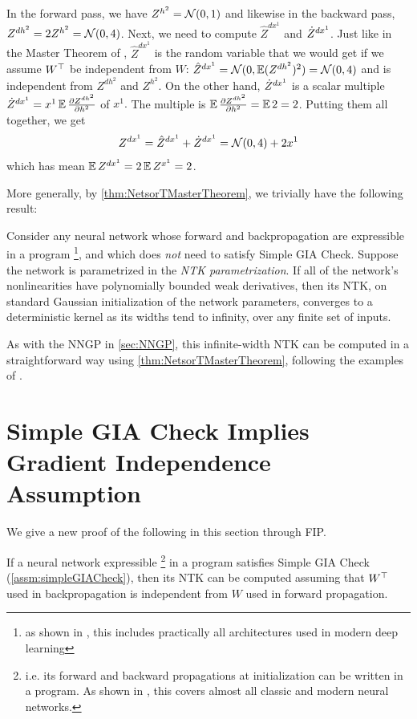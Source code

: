 \documentclass[main.tex]{subfiles}
\begin{document}
In the forward pass, we have $Z^{h^{2}}=\mathcal{N}(0,1)$ and likewise in the backward pass, $Z^{dh^{2}}=2Z^{h^{2}}=\mathcal{N}(0,4)$. Next, we need to compute $\hat{Z}^{dx^{1}}$ and $\dot Z^{dx^{1}}$. Just like in the Master Theorem of \citet{yangTP2}, $\hat{Z}^{dx^{1}}$ is the random variable that we would get if we assume $W^{\top}$ be independent from $W$: $\hat{Z}^{dx^{1}}=\mathcal{N}(0,\operatorname*{\mathbb{E}}(Z^{dh^{2}})^{2})=\mathcal{N}(0,4)$ and is independent from $Z^{dh^{2}}$ and $Z^{h^{2}}$. On the other hand, $\dot Z^{dx^{1}}$ is a scalar multiple $\dot Z^{dx^{1}}=x^{1}\operatorname*{\mathbb{E}}\frac{\partial Z^{dh^{2}}}{\partial h^{2}}$ of $x^{1}.$ The multiple is $\operatorname*{\mathbb{E}}\frac{\partial Z^{dh^{2}}}{\partial h^{2}}=\operatorname*{\mathbb{E}}2=2$. Putting them all together, we get
\[
Z^{dx^{1}}=\hat{Z}^{dx^{1}}+\dot Z^{dx^{1}}=\mathcal{N}(0,4)+2x^{1}
\]
which has mean $\operatorname*{\mathbb{E}} Z^{dx^{1}}=2\operatorname*{\mathbb{E}} Z^{x^{1}}=2$.

More generally, by \cref{thm:NetsorTMasterTheorem}, we trivially have the following result:
\begin{thm}\label{thm:NTK4A}
Consider any neural network whose forward and backpropagation are expressible in a \netsort{} program%
\footnote{as shown in \citet{yangTP2}, this includes practically all architectures used in modern deep learning}, and which does \emph{not} need to satisfy Simple GIA Check.
Suppose the network is parametrized in the \emph{NTK parametrization}.
If all of the network's nonlinearities have polynomially bounded weak derivatives, then its NTK, on standard Gaussian initialization of the network parameters, converges to a deterministic kernel as its widths tend to infinity, over any finite set of inputs.

\end{thm}
As with the NNGP in \cref{sec:NNGP}, this infinite-width NTK can be computed in a straightforward way using \cref{thm:NetsorTMasterTheorem}, following the examples of \citet{yangTP2}.

\section{Simple GIA Check Implies Gradient Independence Assumption}
\label{sec:GIAFIP}

We give a new proof of the following in this section through FIP.
\begin{thm}\label{thm:GIA}
    If a neural network expressible%
    \footnote{i.e. its forward and backward propagations at initialization can be written in a \netsort{} program. As shown in \citet{yangTP1,yangTP2}, this covers almost all classic and modern neural networks.}
    in a \netsort{} program satisfies Simple GIA Check (\cref{assm:simpleGIACheck}), then its NTK can be computed assuming that $W^\top$ used in backpropagation is independent from $W$ used in forward propagation.
\end{thm}
\end{document}
